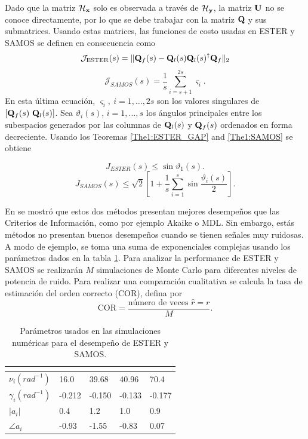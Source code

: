 Dado que la matriz $\mathcal{H}_{\mathbf{x}}$ solo es observada a través de $\mathcal{H}_{\mathbf{y}}$, la matriz $\mathbf{U}$ no se conoce directamente, por lo que se debe  trabajar con la matriz $\mathbf{Q}$ y sus submatrices. Usando estas matrices, las funciones de costo usadas en ESTER y SAMOS se definen en consecuencia como
\[ \mathcal{J}_{\mathrm{ESTER}}(s) = \|\mathbf{Q}_f(s) - \mathbf{Q}_l(s)\mathbf{Q}_l(s)^\dagger\mathbf{Q}_f\|_2\]
\[ \mathcal{J}_{SAMOS}(s) = \frac{1}{s}\sum_{i=s+1}^{2s}\varsigma_i.\]
En esta última ecuación, $\varsigma_i,\ i=1,\ldots,2s$ son los valores singulares de $\left[\mathbf{Q}_f(s)\ \mathbf{Q}_l(s)\right]$. Sea $\vartheta_i(s)$, $i=1,\ldots, s$ los ángulos principales entre los subespacios generados por las columnas de $\mathbf{Q}_l(s)$ y $\mathbf{Q}_f(s)$ ordenados en forma decreciente. Usando los Teoremas \ref{The1:ESTER_GAP} and \ref{The1:SAMOS} se obtiene

\begin{equation}
	J_{ESTER}(s) \leq \sin\vartheta_1(s).
	\label{eq:ESTER_cost}
\end{equation}
\begin{equation}
	J_{SAMOS}(s) \le \sqrt{2} \left[1+ \frac{1}{s}\sum_{i=1}^{s}\sin\frac{\vartheta_{i}(s)}{2}\right].
	\label{eq:SamosBoundHy}    
\end{equation}

En \cite{Badeau2006,Papy2007} se mostró que estos dos métodos presentan mejores desempeños que las Criterios de Información, como por ejemplo Akaike o MDL. Sin embargo, estás métodos no presentan buenos desempeños cuando se tienen señales muy ruidosas. A modo de ejemplo, se toma una suma de exponenciales complejas usando los parámetros dados en la tabla \ref{tab:ejemplo_ester_samos}. Para analizar la performance de ESTER y SAMOS se realizarán $M$ simulaciones de Monte Carlo para diferentes niveles de potencia de ruido. Para realizar una comparación cualitativa se calcula la tasa de estimación del orden correcto (COR), defina por
\[\mathrm{COR} = \frac{\text{número de veces } \hat{r}=r}{M}.\]

\begin{table}[h!]
	\centering
	\begin{tabular}{l|llll}
		& \multicolumn{4}{l}{}  \\  \hline
		$\nu_i(rad^{-1})$    & 16.0   & 39.68   & 40.96   & 70.4 \\
		$\gamma_i(rad^{-1})$ & -0.212 & -0.150  & -0.133  & -0.177  \\
		$|a_i|$              & 0.4    & 1.2     & 1.0     & 0.9     \\
		$\angle a_i$         & -0.93  & -1.55   & -0.83   & 0.07    \\ \hline
	\end{tabular}
	\caption{Parámetros usados en las simulaciones numéricas para el desempeño de ESTER y SAMOS.}
	\label{tab:ejemplo_ester_samos}
\end{table}


